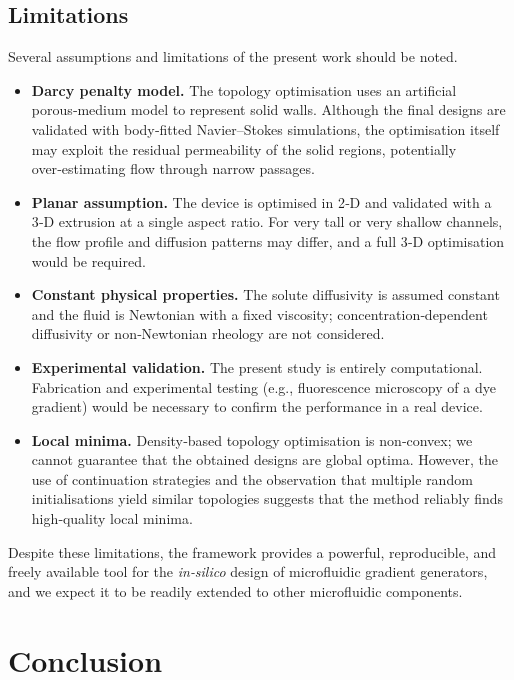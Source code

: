 \documentclass[12pt]{article}
\begin{document}
\subsection{Limitations}
Several assumptions and limitations of the present work should be noted.
\begin{itemize}
\item \textbf{Darcy penalty model.} The topology optimisation uses an artificial porous‑medium model to represent solid walls. Although the final designs are validated with body‑fitted Navier–Stokes simulations, the optimisation itself may exploit the residual permeability of the solid regions, potentially over‑estimating flow through narrow passages.
\item \textbf{Planar assumption.} The device is optimised in 2‑D and validated with a 3‑D extrusion at a single aspect ratio. For very tall or very shallow channels, the flow profile and diffusion patterns may differ, and a full 3‑D optimisation would be required.
\item \textbf{Constant physical properties.} The solute diffusivity is assumed constant and the fluid is Newtonian with a fixed viscosity; concentration‑dependent diffusivity or non‑Newtonian rheology are not considered.
\item \textbf{Experimental validation.} The present study is entirely computational. Fabrication and experimental testing (e.g., fluorescence microscopy of a dye gradient) would be necessary to confirm the performance in a real device.
\item \textbf{Local minima.} Density‑based topology optimisation is non‑convex; we cannot guarantee that the obtained designs are global optima. However, the use of continuation strategies and the observation that multiple random initialisations yield similar topologies suggests that the method reliably finds high‑quality local minima.
\end{itemize}

Despite these limitations, the framework provides a powerful, reproducible, and freely available tool for the \textit{in‑silico} design of microfluidic gradient generators, and we expect it to be readily extended to other microfluidic components.

\section{Conclusion}
\label{sec:conclusion}
\end{document}
